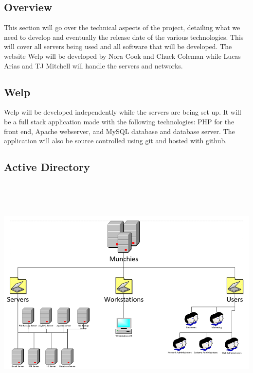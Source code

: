 \documentclass[12pt]{article}
\begin{document}
        \subsection{Overview}
                This section will go over the technical aspects of the 
                project,  detailing what we need to develop and eventually the 
                release date of the various technologies. This will cover all 
                servers being used and all software that will be developed. The 
                website Welp will be developed by Nora Cook and Chuck Coleman while
                Lucas Arias and TJ Mitchell will handle the servers and networks. 

        \subsection{Welp}
                Welp will be developed independently while the servers are
                being set up. It will be a full stack application made with the 
                following technologies: PHP for the front end, Apache webserver, 
                and MySQL database and database server. The application will also
                be source controlled using git and hosted with github. 

        \subsection{Active Directory}
                \includegraphics[width=15cm, height=12cm]{activedirectory.png}
\end{document}
